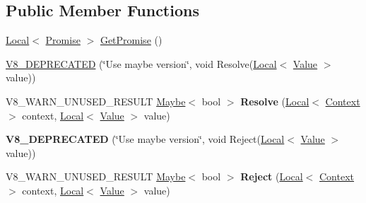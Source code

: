 \subsection*{Public Member Functions}
\begin{DoxyCompactItemize}
\item 
\mbox{\hyperlink{classv8_1_1Local}{Local}}$<$ \mbox{\hyperlink{classv8_1_1Promise}{Promise}} $>$ \mbox{\hyperlink{classv8_1_1Promise_1_1Resolver_a41fd1ffef546a62e363a639935fc8ae3}{Get\+Promise}} ()
\item 
\mbox{\hyperlink{classv8_1_1Promise_1_1Resolver_a3e7921685561ad491a43bc6ac5681627}{V8\+\_\+\+D\+E\+P\+R\+E\+C\+A\+T\+ED}} (\char`\"{}Use maybe version\char`\"{}, void Resolve(\mbox{\hyperlink{classv8_1_1Local}{Local}}$<$ \mbox{\hyperlink{classv8_1_1Value}{Value}} $>$ value))
\item 
\mbox{\label{classv8_1_1Promise_1_1Resolver_a7e5ba9aab1a36574fdfad04da9a543a5}} 
V8\+\_\+\+W\+A\+R\+N\+\_\+\+U\+N\+U\+S\+E\+D\+\_\+\+R\+E\+S\+U\+LT \mbox{\hyperlink{classv8_1_1Maybe}{Maybe}}$<$ bool $>$ {\bfseries Resolve} (\mbox{\hyperlink{classv8_1_1Local}{Local}}$<$ \mbox{\hyperlink{classv8_1_1Context}{Context}} $>$ context, \mbox{\hyperlink{classv8_1_1Local}{Local}}$<$ \mbox{\hyperlink{classv8_1_1Value}{Value}} $>$ value)
\item 
\mbox{\label{classv8_1_1Promise_1_1Resolver_ad4edaafbb52aaba400b875d95a0761d2}} 
{\bfseries V8\+\_\+\+D\+E\+P\+R\+E\+C\+A\+T\+ED} (\char`\"{}Use maybe version\char`\"{}, void Reject(\mbox{\hyperlink{classv8_1_1Local}{Local}}$<$ \mbox{\hyperlink{classv8_1_1Value}{Value}} $>$ value))
\item 
\mbox{\label{classv8_1_1Promise_1_1Resolver_ad9739bdf891d64a93b288c614bffe8e5}} 
V8\+\_\+\+W\+A\+R\+N\+\_\+\+U\+N\+U\+S\+E\+D\+\_\+\+R\+E\+S\+U\+LT \mbox{\hyperlink{classv8_1_1Maybe}{Maybe}}$<$ bool $>$ {\bfseries Reject} (\mbox{\hyperlink{classv8_1_1Local}{Local}}$<$ \mbox{\hyperlink{classv8_1_1Context}{Context}} $>$ context, \mbox{\hyperlink{classv8_1_1Local}{Local}}$<$ \mbox{\hyperlink{classv8_1_1Value}{Value}} $>$ value)
\end{DoxyCompactItemize}
